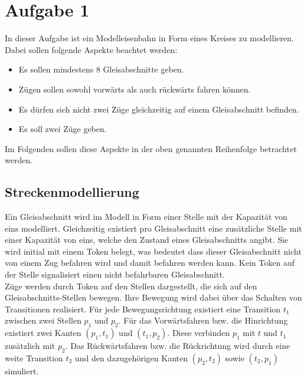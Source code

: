 \documentclass[10pt]{scrartcl}
\author{Carsten Noetzel, Armin Steudte}
\title{\titletext}
\date{23.03.2012}
\begin{document}
\maketitle

\setcounter{tocdepth}{3}
\tableofcontents
\listoffigures

\section{Aufgabe 1}
In dieser Aufgabe ist ein Modelleisenbahn in Form eines Kreises zu modellieren.
Dabei sollen folgende Aspekte beachtet werden:
\begin{itemize}
	\item Es sollen mindestens 8 Gleisabschnitte geben.
	\item Zügen sollen sowohl vorwärts als auch rückwärts fahren können.
	\item Es dürfen sich nicht zwei Züge gleichzeitig auf einem Gleisabschnitt befinden.
	\item Es soll zwei Züge geben.
\end{itemize}
Im Folgenden sollen diese Aspekte in der oben genannten Reihenfolge betrachtet werden.

\subsection{Streckenmodellierung}
Ein Gleisabschnitt wird im Modell in Form einer Stelle mit der Kapazität von eins modelliert.
Gleichzeitig existiert pro Gleisabschnitt eine zusätzliche Stelle mit einer Kapazität von eins, welche den Zustand eines Gleisabschnitts angibt.
Sie wird initial mit einem Token belegt, was bedeutet dass dieser Gleisabschnitt nicht von einem Zug befahren wird und damit befahren werden kann.
Kein Token auf der Stelle signalisiert einen nicht befahrbaren Gleisabschnitt.\\
Züge werden durch Token auf den Stellen dargestellt, die sich auf den Gleisabschnitts-Stellen bewegen.
Ihre Bewegung wird dabei über das Schalten von Transitionen realisiert.
Für jede Bewegungsrichtung existiert eine Transition $t_{1}$ zwischen zwei Stellen $p_{1}$ und $p_{2}$.
Für das Vorwärtsfahren bzw. die Hinrichtung existiert zwei Kanten $(p_{1},t_{1})$ und $(t_{1},p_{2})$. Diese verbinden $p_{1}$ mit $t$ und $t_{1}$ zusätzlich mit $p_{2}$.
Das Rückwärtsfahren bzw. die Rückrichtung wird durch eine weite Transition $t_{2}$ und den dazugehörigen Kanten $(p_{2},t_{2})$ sowie $(t_{2},p_{1})$ simuliert.
\end{document}
